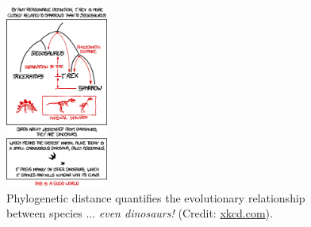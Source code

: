 \documentclass[12pt]{article}
\begin{document}
\begin{figure}
\centering
\includegraphics[width=0.3\textwidth]{figures/birds_and_dinosaurs.png}
\caption{\label{fig:3} Phylogenetic distance quantifies the evolutionary relationship between species ... \textit{even dinosaurs!} (Credit: \url{xkcd.com}).}
\end{figure}



\end{document}
